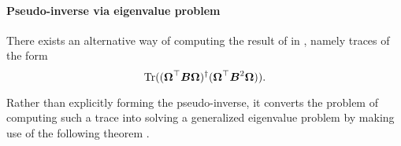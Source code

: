 \paragraph{Pseudo-inverse via eigenvalue problem}

There exists an alternative way of computing the result of 
in , namely traces of the form
\begin{equation}
    \operatorname{Tr}((\boldsymbol{\Omega}^{\top} \boldsymbol{B} \boldsymbol{\Omega})^{\dagger}(\boldsymbol{\Omega}^{\top} \boldsymbol{B}^2 \boldsymbol{\Omega})).
    \label{equ:3-nystrom-trace-pseudo-inverse}
\end{equation}

Rather than explicitly forming the pseudo-inverse,
it converts the problem of computing such a trace into solving a generalized
eigenvalue problem by making use of the following theorem \cite[theorem~3]{lin2017randomized}.

